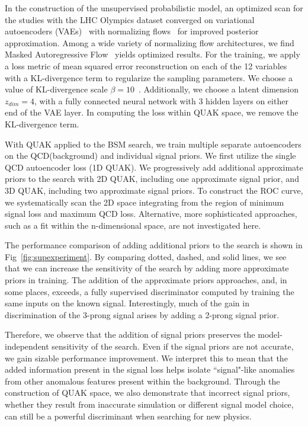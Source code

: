 \documentclass[a4paper,11pt]{article}
\begin{document}
In the construction of the unsupervised probabilistic model, an optimized scan for the studies with the LHC Olympics dataset converged on variational autoencoders (VAEs)~\cite{kingma2014autoencoding} with normalizing flows~\cite{rezende2015variational} for improved posterior approximation. Among a wide variety of normalizing flow architectures, we find Masked Autoregressive Flow~\cite{papamakarios2017masked} yields optimized results. For the training, we apply a loss metric of mean squared error reconstruction on each of the 12 variables with a KL-divergence term to regularize the sampling parameters. We choose a value of KL-divergence scale $\beta=10$~\cite{Higgins2017betaVAELB}. Additionally, we choose a latent dimension $z_{dim} = 4$, with a fully connected neural network with 3 hidden layers on either end of the VAE layer. In computing the loss within QUAK space, we remove the KL-divergence term.

With QUAK applied to the BSM search, we train multiple separate autoencoders on the QCD(background) and individual signal priors. We first utilize the single QCD autoencoder loss (1D QUAK). We progressively add additional approximate priors to the search with 2D QUAK, including one approximate signal prior, and 3D QUAK, including two approximate signal priors. To construct the ROC curve, we systematically scan the 2D space integrating from the region of minimum signal loss and maximum QCD loss. Alternative, more sophisticated approaches, such as a fit within the n-dimensional space, are not investigated here. 











The performance comparison of adding additional priors to the search is shown in Fig~\ref{fig:supexperiment}. By comparing dotted, dashed, and solid lines, we see that we can increase the sensitivity of the search by adding more approximate priors in training. The addition of the approximate priors approaches, and, in some places, exceeds, a fully supervised discriminator computed by training the same inputs on the known signal. Interestingly, much of the gain in discrimination of the 3-prong signal arises by adding a 2-prong signal prior. 



Therefore, we observe that the addition of signal priors preserves the model-independent sensitivity of the search. Even if the signal priors are not accurate, we gain sizable performance improvement. We interpret this to mean that the added information present in the signal loss helps isolate ``signal"-like anomalies from other anomalous features present within the background. Through the construction of QUAK space, we also demonstrate that incorrect signal priors, whether they result from inaccurate simulation or different signal model choice, can still be a powerful discriminant when searching for new physics. 
\end{document}
